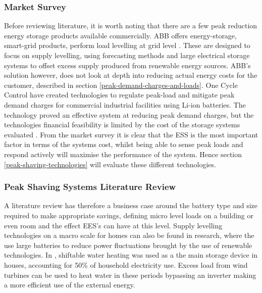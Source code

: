 \subsubsection{Market Survey}\label{market-survey}

Before reviewing literature, it is worth noting that there are a few
peak reduction energy storage products available commercially. ABB
offers energy-storage, smart-grid products, perform load levelling at
grid level \cite{abbpeakshave}. These are designed to focus on supply
levelling, using forecasting methods and large electrical storage
systems to offset excess supply \cite{5559470} produced from renewable
energy sources. ABB's solution however, does not look at depth into
reducing actual energy costs for the customer, described in section
\ref{peak-demand-charges-and-loads}. One Cycle Control have created
technologies to regulate peak-load and mitigate peak demand charges for
commercial industrial facilities using Li-ion
batteries\cite{peakload38:online}. The technology proved an effective
system at reducing peak demand charges, but the technologies financial
feasibility is limited by the cost of the storage systems evaluated
\cite{Demonstr51:online}. From the market survey it is clear that the
ESS is the most important factor in terms of the systems cost, whilst
being able to sense peak loads and respond actively will maximise the
performance of the system. Hence section \ref{peak-shaving-technologies}
will evaluate these different technologies.

\subsubsection{Peak Shaving Systems Literature
Review}\label{peak-shaving-systems-literature-review}

A literature review has therefore a business case around the battery
type and size required to make appropriate savings, defining micro level
loads on a building or even room and the effect EES's can have at this
level. Supply levelling technologies on a macro scale for homes can also
be found in research, where the use large batteries to reduce power
fluctuations brought by the use of renewable technologies. In
\cite{Allik20161116}, shiftable water heating was used as a the main
storage device in houses, accounting for 50\% of household electricity
use. Excess load from wind turbines can be used to heat water in these
periods bypassing an inverter making a more efficient use of the
external energy. \cite{7564619}

